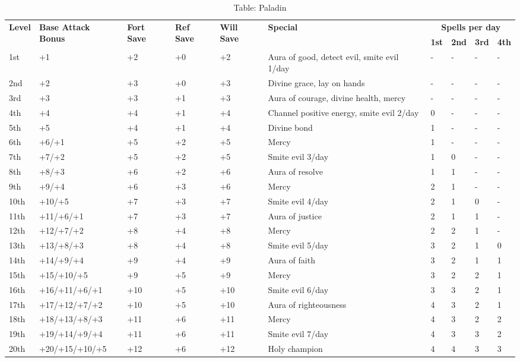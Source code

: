 \begin{table*}[]
\sffamily
\caption{Table: Paladin}
\begin{tabularx}{\linewidth}{lllllXllll}
\multirow{2}{*}{\textbf{Level}} & \multirow{2}{*}{\parbox{5em}{\textbf{Base Attack Bonus}}} & \multirow{2}{*}{\parbox{1.5em}{\textbf{Fort Save}}} & \multirow{2}{*}{\parbox{1.5em}{\textbf{Ref Save}}} & \multirow{2}{*}{\parbox{1.5em}{\textbf{Will Save}}} & \multirow{2}{*}{\textbf{Special}}  & \multicolumn{4}{c}{\textbf{Spells per day}} \\
                       &                                    &                            &                           &                            &                                                                        & \textbf{1st}  & \textbf{2nd} & \textbf{3rd} & \textbf{4th} \\
1st & +1 & +2 & +0 & +2 & Aura of good, detect evil, smite evil 1/day & - & - & - & -\\
2nd & +2 & +3 & +0 & +3 & Divine grace, lay on hands & - & - & - & -\\
3rd & +3 & +3 & +1 & +3 & Aura of courage, divine health, mercy & - & - & - & -\\
4th & +4 & +4 & +1 & +4 & Channel positive energy, smite evil 2/day & 0 & - & - & -\\
5th & +5 & +4 & +1 & +4 & Divine bond & 1 & - & - & -\\
6th & +6/+1 & +5 & +2 & +5 & Mercy & 1 & - & - & -\\
7th & +7/+2 & +5 & +2 & +5 & Smite evil 3/day & 1 & 0 & - & -\\
8th & +8/+3 & +6 & +2 & +6 & Aura of resolve & 1 & 1 & - & -\\
9th & +9/+4 & +6 & +3 & +6 & Mercy & 2 & 1 & - & -\\
10th & +10/+5 & +7 & +3 & +7 & Smite evil 4/day & 2 & 1 & 0 & -\\
11th & +11/+6/+1 & +7 & +3 & +7 & Aura of justice & 2 & 1 & 1 & -\\
12th & +12/+7/+2 & +8 & +4 & +8 & Mercy & 2 & 2 & 1 & -\\
13th & +13/+8/+3 & +8 & +4 & +8 & Smite evil 5/day & 3 & 2 & 1 & 0\\
14th & +14/+9/+4 & +9 & +4 & +9 & Aura of faith & 3 & 2 & 1 & 1\\
15th & +15/+10/+5 & +9 & +5 & +9 & Mercy & 3 & 2 & 2 & 1\\
16th & +16/+11/+6/+1 & +10 & +5 & +10 & Smite evil 6/day & 3 & 3 & 2 & 1\\
17th & +17/+12/+7/+2 & +10 & +5 & +10 & Aura of righteousness & 4 & 3 & 2 & 1\\
18th & +18/+13/+8/+3 & +11 & +6 & +11 & Mercy & 4 & 3 & 2 & 2\\
19th & +19/+14/+9/+4 & +11 & +6 & +11 & Smite evil 7/day & 4 & 3 & 3 & 2\\
20th & +20/+15/+10/+5 & +12 & +6 & +12 & Holy champion & 4 & 4 & 3 & 3\\
\end{tabularx}
\end{table*}

